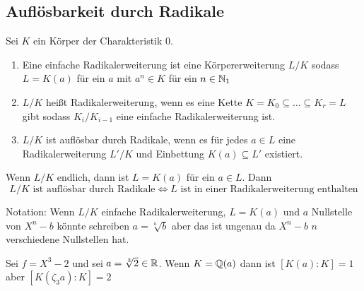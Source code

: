 \subsection{Auflösbarkeit durch Radikale}
\begin{Def}
    Sei $K$ ein Körper der Charakteristik 0.
    \begin{enumerate}
        \item Eine einfache Radikalerweiterung ist eine Körpererweiterung $L/K$ sodass $L=K(a)$ für ein $a$ mit $a^n\in K$ für ein $n\in\mathbb{N}_1$
        \item $L/K$ heißt Radikalerweiterung, wenn es eine Kette $K=K_0\subseteq\dots \subseteq K_r=L$ gibt sodass $K_i/K_{i-1}$ eine einfache Radikalerweiterung ist.
        \item $L/K$ ist auflösbar durch Radikale, wenn es für jedes $a\in L$ eine Radikalerweiterung $L'/K$ und Einbettung $K(a)\subseteq L'$ existiert.
    \end{enumerate}
\end{Def}
\begin{Bem}
    Wenn $L/K$ endlich, dann ist $L=K(a)$ für ein $a\in L$.
    Dann
    $$L/K \text{ ist auflösbar durch Radikale}\iff L\text{ ist in einer Radikalerweiterung enthalten}$$
\end{Bem}
\begin{Bem}
    Notation: Wenn $L/K$ einfache Radikalerweiterung, $L=K(a)$ und $a$ Nullstelle von $X^n-b$ könnte schreiben $a=\sqrt[n]{b}$ aber das ist ungenau da $X^n-b$ $n$ verschiedene Nullstellen hat.
\end{Bem}
\begin{Bsp}
    Sei $f=X^3-2$ und sei $a=\sqrt[3]{2}\in\mathbb{R}$. Wenn $K=\mathbb{Q}(a)$ dann ist $[K(a):K]=1$ aber $[K(\zeta_3 a):K]=2$
\end{Bsp}
